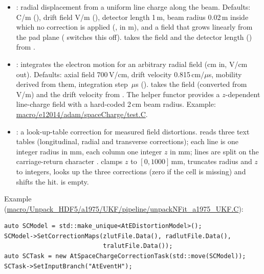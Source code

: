 \begin{itemize}
\item {}: radial displacement from a uniform line charge along the beam. Defaults:
   C/m (), drift field  V/m (),
  detector length 1\,m, beam radius 0.02\,m inside which no correction is applied (, in m), and a
  field that grows linearly from the pad plane ( switches this off).
   takes the field and the detector length () from .
\item {}: integrates the electron motion for an arbitrary radial field
   (cm in, V/cm out). Defaults: axial field 700\,V/cm, drift
  velocity 0.815\,cm/$\mu$s, mobility derived from them, integration step \,$\mu$s ().
   takes the field (converted from V/m) and the drift velocity from . The helper
  functor  provides a $z$-dependent line-charge field with a hard-coded 2\,cm beam
  radius. Example: \url{macro/e12014/adam/spaceCharge/test.C}.
\item {}: a look-up-table correction for measured field distortions.
   reads three text tables (longitudinal, radial and transverse
  corrections); each line is one integer radius in mm, each column one integer $z$ in mm; lines are split on the
  carriage-return character .  clamps $z$ to $[0,1000]$\,mm, truncates
  radius and $z$ to integers, looks up the three corrections (zero if the cell is missing) and shifts the hit.
   is empty.
\end{itemize}
Example (\url{macro/Unpack_HDF5/a1975/UKF/pipeline/unpackNFit_a1975_UKF.C}):
\begin{verbatim}
auto SCModel = std::make_unique<AtEDistortionModel>();
SCModel->SetCorrectionMaps(zlutFile.Data(), radlutFile.Data(),
                           tralutFile.Data());
auto SCTask = new AtSpaceChargeCorrectionTask(std::move(SCModel));
SCTask->SetInputBranch("AtEventH");
\end{verbatim}

